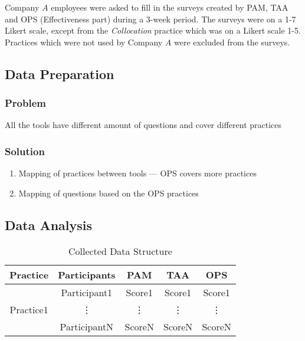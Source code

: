 Company $A$ employees were asked to fill in the surveys created by PAM, TAA and OPS (Effectiveness part) during a 3-week period. The surveys were on a 1-7 Likert scale, except from the \textit{Collocation} practice which was on a Likert scale 1-5.
Practices which were not used by Company $A$ were excluded from the surveys.

\clearpage


\subsection{Data Preparation}

\subsubsection{Problem}
All the tools have different amount of questions and cover different practices

\subsubsection{Solution}
\begin{enumerate}
	\item Mapping of practices between tools --- OPS covers more practices
	\item Mapping of questions based on the OPS practices
\end{enumerate}

\clearpage


\subsection{Data Analysis}

\begin{table} [H]
\centering
	\begin{tabular}{| c | c | c | c | c |} \hline
	\textbf{Practice} & \textbf{Participants} & \textbf{PAM} & \textbf{TAA} & \textbf{OPS} \\ \hline
	\multirow{3}{*}{Practice1} & Participant1 & Score1 & Score1 & Score1 \\ \hhline{~----}
	& \vdots & \vdots & \vdots  & \vdots \\ \hhline{~----}
	& ParticipantN & ScoreN & ScoreN & ScoreN \\ \hline
	\end{tabular}
	\caption{Collected Data Structure}
	\label{table:data_structure}
\end{table}

